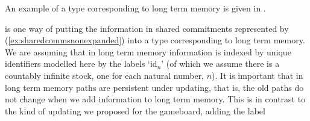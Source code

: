   
An example of a type corresponding to long term memory is given in
\nexteg{}.
\begin{ex} 
\label{ex:ltm} 
\end{ex} 
\preveg{} is one way of putting the information in shared commitments represented by
(\ref{ex:sharedcommsnonexpanded}) into a type corresponding to long term
memory.  We are assuming that in long term memory information is
indexed by unique identifiers modelled here by the labels `id$_n$' (of
which we assume there is a countably infinite stock, one for each
natural number, $n$).  It is important that in long term memory paths
are persistent under updating, that is, the old paths do not change
when we add information to long term memory.  This is in contrast to
the kind of updating we proposed for the gameboard, adding the label
